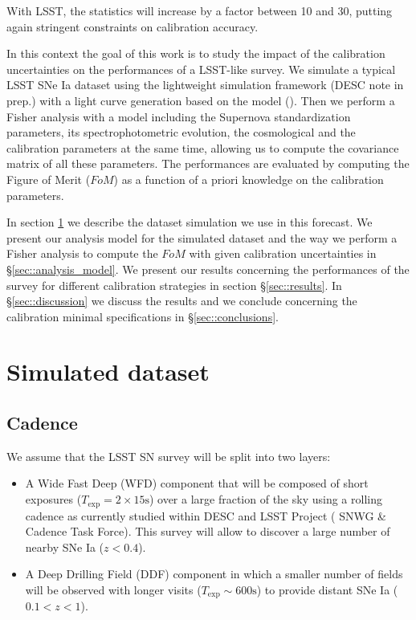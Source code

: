 \documentclass[\docopts]{\docclass}
\begin{document}
With LSST, the statistics will increase by a factor between 10 and 30, putting again stringent constraints on calibration accuracy.

In this context the goal of this work is to study the impact of the calibration uncertainties on the performances of a LSST-like survey.
We simulate a typical LSST SNe Ia dataset using the lightweight simulation framework  (DESC note in prep.) with a light curve generation based on the  model (\cite{SALT2}).
Then we perform a Fisher analysis with a model including the Supernova standardization parameters, its spectrophotometric evolution, the cosmological and the calibration parameters at the same time, allowing us to compute the covariance matrix of all these parameters.
The performances are evaluated by computing the Figure of Merit ($FoM$) as a function of a priori knowledge on the calibration parameters.

In section \ref{sec::simulated_dataset} we describe the dataset simulation we use in this forecast.
We present our analysis model for the simulated dataset and the way we perform a Fisher analysis to compute the $FoM$ with given calibration uncertainties in §\ref{sec::analysis_model}.
We present our results concerning the performances of the survey for different calibration strategies in section §\ref{sec::results}.
In §\ref{sec::discussion} we discuss the results and we conclude concerning the calibration minimal specifications in §\ref{sec::conclusions}.


\section{Simulated dataset}
\label{sec::simulated_dataset}

\subsection{Cadence}
\label{subsec::cadence}

We assume that the LSST SN survey will be split into two layers:
\begin{itemize}
\item A Wide Fast Deep (WFD) component that will be composed of short exposures ($T_\text{exp} = 2 \times 15\mathrm{s}$) over a large fraction of the sky using a rolling cadence as currently studied within DESC and LSST Project ( SNWG \& Cadence Task Force).
  This survey will allow to discover a large number of nearby SNe Ia ($z < 0.4$).
\item A Deep Drilling Field (DDF) component in which a smaller number of fields will be observed with longer visits ($T_\text{exp} \sim \mathrm{600s}$) to provide distant SNe Ia ($ 0.1 < z < 1$).
\end{itemize}
\end{document}
